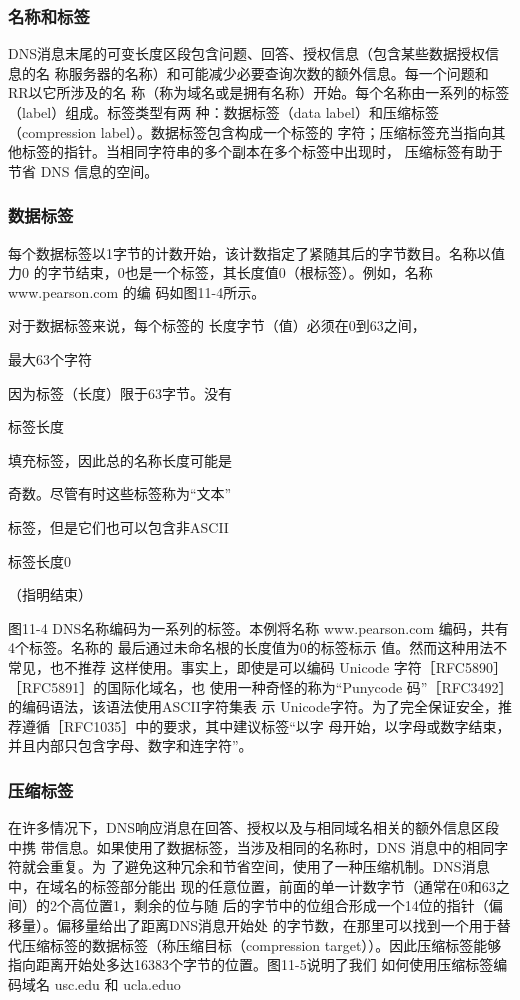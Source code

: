 \subsubsection{名称和标签}

DNS消息末尾的可变长度区段包含问题、回答、授权信息（包含某些数据授权信息的名
称服务器的名称）和可能减少必要查询次数的额外信息。每一个问题和 RR以它所涉及的名
称（称为域名或是拥有名称）开始。每个名称由一系列的标签（label）组成。标签类型有两
种：数据标签（data label）和压缩标签（compression label）。数据标签包含构成一个标签的
字符；压缩标签充当指向其他标签的指针。当相同字符串的多个副本在多个标签中出现时，
压缩标签有助于节省 DNS 信息的空间。

\subsubsection{数据标签}

每个数据标签以1字节的计数开始，该计数指定了紧随其后的字节数目。名称以值力0
的字节结束，0也是一个标签，其长度值0（根标签）。例如，名称www.pearson.com 的编
码如图11-4所示。

对于数据标签来说，每个标签的
长度字节（值）必须在0到63之间，

最大63个字符

因为标签（长度）限于63字节。没有

标签长度

填充标签，因此总的名称长度可能是

奇数。尽管有时这些标签称为“文本”

标签，但是它们也可以包含非ASCII

标签长度0

（指明结束）

图11-4 DNS名称编码为一系列的标签。本例将名称
www.pearson.com 编码，共有4个标签。名称的
最后通过未命名根的长度值为0的标签标示
值。然而这种用法不常见，也不推荐
这样使用。事实上，即使是可以编码 Unicode 字符［RFC5890］［RFC5891］的国际化域名，也
使用一种奇怪的称为“Punycode 码”［RFC3492］的编码语法，该语法使用ASCII字符集表
示 Unicode字符。为了完全保证安全，推荐遵循［RFC1035］中的要求，其中建议标签“以字
母开始，以字母或数字结束，并且内部只包含字母、数字和连字符”。

\subsubsection{压缩标签}

在许多情况下，DNS响应消息在回答、授权以及与相同域名相关的额外信息区段中携
带信息。如果使用了数据标签，当涉及相同的名称时，DNS 消息中的相同字符就会重复。为
了避免这种冗余和节省空间，使用了一种压缩机制。DNS消息中，在域名的标签部分能出
现的任意位置，前面的单一计数字节（通常在0和63之间）的2个高位置1，剩余的位与随
后的字节中的位组合形成一个14位的指针（偏移量）。偏移量给出了距离DNS消息开始处
的字节数，在那里可以找到一个用于替代压缩标签的数据标签（称压缩目标（compression
target））。因此压缩标签能够指向距离开始处多达16383个字节的位置。图11-5说明了我们
如何使用压缩标签编码域名 usc.edu 和 ucla.eduo

